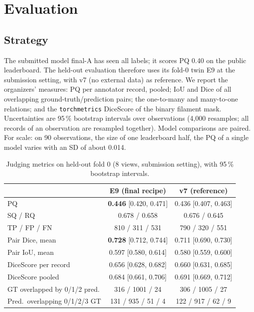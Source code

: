 \documentclass[sigconf]{acmart}
\begin{document}
\section{Evaluation}\label{sec:evaluation}

\subsection{Strategy}
The submitted model final-A has seen all labels; it scores PQ 0.40 on the public leaderboard. The held-out evaluation therefore uses its fold-0 twin E9 at the submission setting, with v7 (no external data) as reference. We report the organizers' measures: PQ per annotator record, pooled; IoU and Dice of all overlapping ground-truth/prediction pairs; the one-to-many and many-to-one relations; and the \texttt{torchmetrics} DiceScore of the binary filament mask. Uncertainties are 95\,\% bootstrap intervals over observations (4,000 resamples; all records of an observation are resampled together). Model comparisons are paired. For scale: on 90 observations, the size of one leaderboard half, the PQ of a single model varies with an SD of about 0.014.

\begin{table}[t]
\caption{Judging metrics on held-out fold 0 (8 views, submission setting), with 95\,\% bootstrap intervals.}
\label{tab:metrics}
\small
\setlength{\tabcolsep}{3.5pt}
\begin{tabular}{@{}lcc@{}}
\toprule
 & E9 (final recipe) & v7 (reference)\\
\midrule
PQ & \textbf{0.446} [0.420, 0.471] & 0.436 [0.407, 0.463]\\
SQ / RQ & 0.678 / 0.658 & 0.676 / 0.645\\
TP / FP / FN & 810 / 311 / 531 & 790 / 320 / 551\\
Pair Dice, mean & \textbf{0.728} [0.712, 0.744] & 0.711 [0.690, 0.730]\\
Pair IoU, mean & 0.597 [0.580, 0.614] & 0.580 [0.559, 0.600]\\
DiceScore per record & 0.656 [0.628, 0.682] & 0.660 [0.631, 0.685]\\
DiceScore pooled & 0.684 [0.661, 0.706] & 0.691 [0.669, 0.712]\\
GT overlapped by 0/1/2 pred. & 316 / 1001 / 24 & 306 / 1005 / 27\\
Pred.\ overlapping 0/1/2/3 GT & 131 / 935 / 51 / 4 & 122 / 917 / 62 / 9\\
\bottomrule
\end{tabular}
\end{table}
\end{document}
